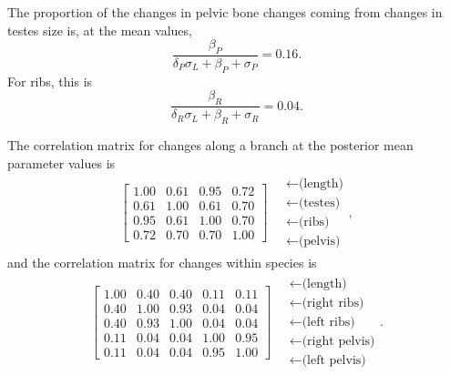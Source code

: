 \documentclass{article}
\begin{document}
The proportion of the changes in pelvic bone changes coming from changes in testes size is, at the mean values,
\[
\frac{\beta_P}{ \delta_P \sigma_L + \beta_P + \sigma_P } = 0.16 .
\]
For ribs, this is
\[
\frac{\beta_R}{ \delta_R \sigma_L + \beta_R + \sigma_R } = 0.04 .
\]

The correlation matrix for changes along a branch at the posterior mean parameter values is \\
\begin{align}
\begin{bmatrix}
   1.00 & 0.61 & 0.95 & 0.72 \\ 
   0.61 & 1.00 & 0.61 & 0.70 \\ 
   0.95 & 0.61 & 1.00 & 0.70 \\ 
   0.72 & 0.70 & 0.70 & 1.00 
 \end{bmatrix}
\quad \begin{matrix}
  \leftarrow \text{(length)} \\
  \leftarrow \text{(testes)} \\
  \leftarrow \text{(ribs)} \\
  \leftarrow \text{(pelvis)} 
\end{matrix} ,
\end{align}
and the correlation matrix for changes within species is
\begin{align}
\begin{bmatrix}
  1.00 & 0.40 & 0.40 & 0.11 & 0.11 \\ 
  0.40 & 1.00 & 0.93 & 0.04 & 0.04 \\ 
  0.40 & 0.93 & 1.00 & 0.04 & 0.04 \\ 
  0.11 & 0.04 & 0.04 & 1.00 & 0.95 \\ 
  0.11 & 0.04 & 0.04 & 0.95 & 1.00 
 \end{bmatrix}
\quad \begin{matrix}
  \leftarrow \text{(length)} \\
  \leftarrow \text{(right ribs)} \\
  \leftarrow \text{(left ribs)} \\
  \leftarrow \text{(right pelvis)} \\
  \leftarrow \text{(left pelvis)} 
\end{matrix}  .
\end{align}
\end{document}
